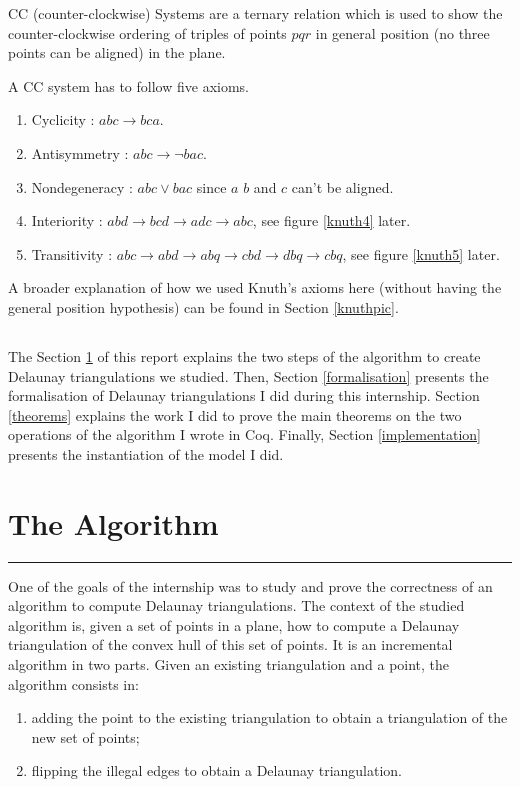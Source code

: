 \documentclass[a4paper,10pt]{article}
\begin{document}
CC (counter-clockwise) Systems are a ternary relation which is used to show the counter-clockwise ordering of triples of points $pqr$ in general position (no three points can be aligned) in the plane.

A CC system has to follow five axioms.
\begin{enumerate}
\item Cyclicity : $abc \rightarrow bca$.
\item Antisymmetry : $abc\rightarrow \neg bac$.
\item Nondegeneracy : $abc \vee bac$ since $a$ $b$ and $c$ can't be aligned.
\item Interiority : $abd \rightarrow bcd \rightarrow adc \rightarrow abc$, see figure \ref{knuth4} later.
\item Transitivity : $ abc \rightarrow abd \rightarrow abq \rightarrow cbd \rightarrow dbq \rightarrow cbq $, see figure \ref{knuth5} later.
\end{enumerate}

A broader explanation of how we used Knuth's axioms here (without having the general position hypothesis) can be found in Section \ref{knuthpic}.

\subsection*{}
The Section \ref{algo} of this report explains the two steps of the algorithm to create Delaunay triangulations we studied. Then, Section \ref{formalisation} presents the formalisation of Delaunay triangulations I did during this internship. Section \ref{theorems} explains the work I did to prove the main theorems on the two operations of the algorithm I wrote in {\sc Coq}. Finally, Section \ref{implementation} presents the instantiation of the model I did.

\section{The Algorithm}
\label{algo}
\rule{\linewidth}{0.5pt}

One of the goals of the internship was to study and prove the correctness of an algorithm to compute Delaunay triangulations. The context of the studied algorithm is, given a set of points in a plane, how to compute a Delaunay triangulation of the convex hull of this set of points. It is an incremental algorithm in two parts. Given an existing triangulation and a point, the algorithm consists in:
\begin{enumerate}
\item adding the point to the existing triangulation to obtain a triangulation of the new set of points;
\item flipping the illegal edges to obtain a Delaunay triangulation.
\end{enumerate}
\end{document}
